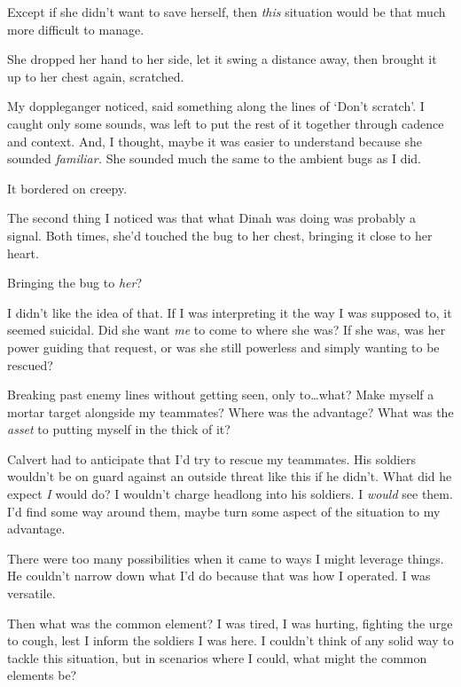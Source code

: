 Except if she didn't want to save herself, then \emph{this }situation would be that much more difficult to manage.



She dropped her hand to her side, let it swing a distance away, then brought it up to her chest again, scratched.



My doppleganger noticed, said something along the lines of `Don't scratch'.  I caught only some sounds, was left to put the rest of it together through cadence and context.  And, I thought, maybe it was easier to understand because she sounded \emph{familiar.  }She sounded much the same to the ambient bugs as I did.



It bordered on creepy.



The second thing I noticed was that what Dinah was doing was probably a signal.  Both times, she'd touched the bug to her chest, bringing it close to her heart.



Bringing the bug to \emph{her}?



I didn't like the idea of that.  If I was interpreting it the way I was supposed to, it seemed suicidal.  Did she want \emph{me }to come to where she was?  If she was, was her power guiding that request, or was she still powerless and simply wanting to be rescued?



Breaking past enemy lines without getting seen, only to\ldots what?  Make myself a mortar target alongside my teammates?  Where was the advantage?  What was the \emph{asset} to putting myself in the thick of it?



Calvert had to anticipate that I'd try to rescue my teammates.  His soldiers wouldn't be on guard against an outside threat like this if he didn't.  What did he expect \emph{I} would do?  I wouldn't charge headlong into his soldiers.  I \emph{would} see them.  I'd find some way around them, maybe turn some aspect of the situation to my advantage.



There were too many possibilities when it came to ways I might leverage things.  He couldn't narrow down what I'd do because that was how I operated.  I was versatile.



Then what was the common element?  I was tired, I was hurting, fighting the urge to cough, lest I inform the soldiers I was here.  I couldn't think of any solid way to tackle this situation, but in scenarios where I could, what might the common elements be?



